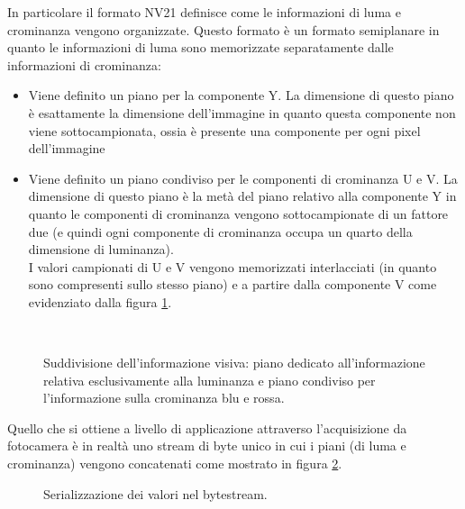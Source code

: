 \noindent In particolare il formato NV21 definisce come le informazioni di luma e crominanza vengono organizzate. Questo formato è un formato semiplanare in quanto le informazioni di luma sono memorizzate separatamente dalle informazioni di crominanza: 
\begin{itemize}
  \item Viene definito un piano per la componente Y. La dimensione di questo piano è esattamente la dimensione dell'immagine in quanto questa componente non viene sottocampionata, ossia è presente una componente per ogni pixel dell'immagine
  \item Viene definito un piano condiviso per le componenti di crominanza U e V. La dimensione di questo piano è la metà del piano relativo alla componente Y in quanto le componenti di crominanza vengono sottocampionate di un fattore due (e quindi ogni componente di crominanza occupa un quarto della dimensione di luminanza).\\
  I valori campionati di U e V vengono memorizzati interlacciati (in quanto sono compresenti sullo stesso piano) e a partire dalla componente V come evidenziato dalla figura \ref{YUVplanes}.\\
\end{itemize}
\begin{figure}[!ht]
\begin{center}
~
\end{center}
\caption{Suddivisione dell'informazione visiva: piano dedicato all'informazione relativa esclusivamente alla luminanza e piano condiviso per l'informazione sulla crominanza blu e rossa.}
\label{YUVplanes}
\end{figure}

\noindent Quello che si ottiene a livello di applicazione attraverso l'acquisizione da fotocamera è in realtà uno stream di byte unico in cui i piani (di luma e crominanza) vengono concatenati come mostrato in figura \ref{YUVbytestream}.
\begin{figure}[!ht]
\begin{center}
\makebox[\linewidth]{\YUVbytestream}
\end{center}
\caption{Serializzazione dei valori nel bytestream.}
\label{YUVbytestream}
\end{figure}


